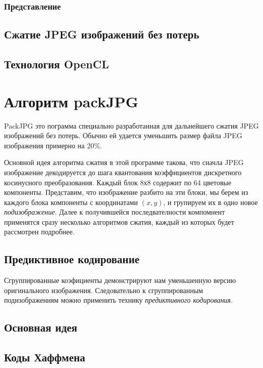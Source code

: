 \documentclass{matmex-diploma-custom}
\begin{document}
\subsubsection{Представление}
\subsection{Сжатие JPEG изображений без потерь}
\subsection{Технология OpenCL}
\section{Алгоритм packJPG}

PackJPG это пограмма специально разработанная для дальнейшего сжатия JPEG изображений без потерь. Обычно ей удается уменьшить размер файла JPEG изображения  примерно на 20\%.

Основной идея алгоритма сжатия в этой программе такова, что сначла JPEG изображение декодируется до шага квантования коэффициентов дискретного косинусного преобразования. Каждый блок 8х8 содержит по 64 цветовые компоненты. Представим, что изображение разбито на эти блоки, мы берем из каждого блока компоненты с координатами $(x,y)$, и групируем их в одно новое \emph{подизображение}. Далее к получившейся последвателности компомнент применятся сразу несколько алгоритмов сжатия, каждый из которых будет рассмотрен подробнее.

  \subsection{Предиктивное кодирование}
  Сгруппированные коэфициенты демонстрируют нам уменьшенную версию оригинального изображения. Следовательно к сгруппированным подизображениям можно применить технику \emph{предиктивного кодирования}.


\subsection{Основная идея}
\subsection{Коды Хаффмена}
\end{document}
